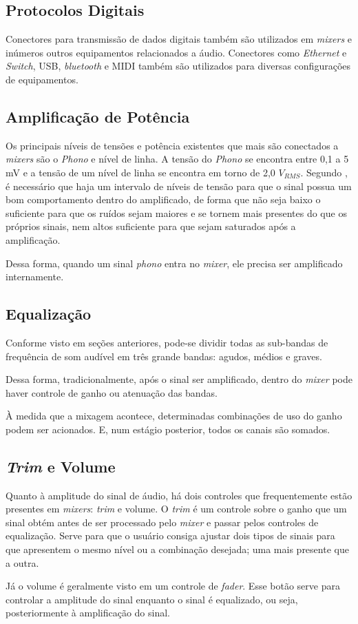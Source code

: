 \subsection{Protocolos Digitais}

Conectores para transmissão de dados digitais também são utilizados em \textit{mixers} e inúmeros outros equipamentos relacionados a áudio. Conectores como \textit{Ethernet} e \textit{Switch}, USB, \textit{bluetooth} e MIDI também são utilizados para diversas configurações de equipamentos.
  
\subsection{Amplificação de Potência}

Os principais níveis de tensões e potência existentes que mais são conectados a \textit{mixers} são o \textit{Phono} e nível de linha. A tensão do \textit{Phono} se encontra entre 0,1 a 5 mV e a tensão de um nível de linha se encontra em torno de 2,0 $V_{RMS}$. Segundo \cite{self2013audio}, é necessário que haja um intervalo de níveis de tensão para que o sinal possua um bom comportamento dentro do amplificado, de forma que não seja baixo o suficiente para que os ruídos sejam maiores e se tornem mais presentes do que os próprios sinais, nem altos suficiente para que sejam saturados após a amplificação. 
\par
Dessa forma, quando um sinal \textit{phono} entra no \textit{mixer}, ele precisa ser amplificado internamente.

\subsection{Equalização}

Conforme visto em seções anteriores, pode-se dividir todas as sub-bandas de frequência de som audível em três grande bandas: agudos, médios e graves. 
\par
Dessa forma, tradicionalmente, após o sinal ser amplificado, dentro do \textit{mixer} pode haver controle de ganho ou atenuação das bandas.
\par
À medida que a mixagem acontece, determinadas combinações de uso do ganho podem ser acionados. E, num estágio posterior, todos os canais são somados.

\subsection{\textit{Trim} e Volume}
Quanto à amplitude do sinal de áudio, há dois controles que frequentemente estão presentes em \textit{mixers}: \textit{trim} e volume. O \textit{trim} é um controle sobre o ganho que um sinal obtém antes de ser processado pelo \textit{mixer} e passar pelos controles de equalização. Serve para que o usuário consiga ajustar dois tipos de sinais para que apresentem o mesmo nível ou a combinação desejada; uma mais presente que a outra.
\par
Já o volume é geralmente visto em um controle de \textit{fader}. Esse botão serve para controlar a amplitude do sinal enquanto o sinal é equalizado, ou seja, posteriormente à amplificação do sinal.


